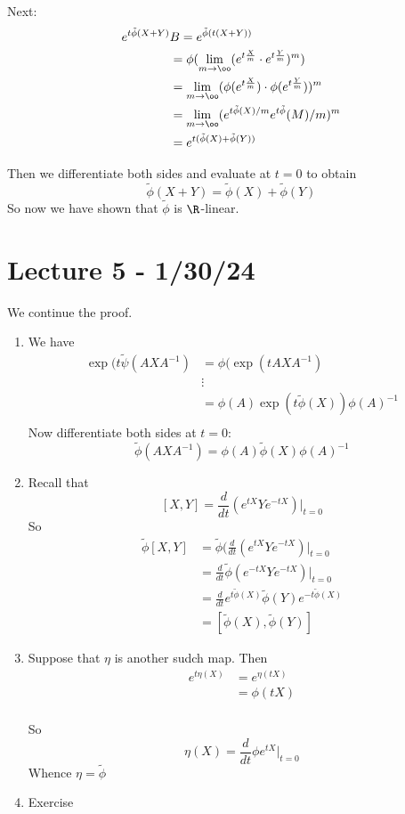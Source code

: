 \documentclass[x11names,reqno,14pt]{extarticle}
\newcommand{\tphi}{\tilde{\phi}}
\newcommand{\dd}[2]{\frac{d#1}{d#2}}
\begin{document}
Next: 
\begin{align*}
e^{t\tilde{\phi}(X + Y)} & B= e^{\tilde{\phi}(t(X + Y))}\\
								  & = \phi(\lim_{m\to\oo}(e^{t\frac{X}{m}}\cdot e^{t\frac{Y}{m}})^m) \\
								 & = \lim_{m\to\oo}(\phi(e^{t\frac{X}{m}})\cdot \phi(e^{t\frac{Y}{m}}))^m \\
								 & = \lim_{m\to\oo}(e^{t\tilde{\phi}(X)/m}e^{t\tilde{\phi}}(M)/m)^m \\
								 & = e^{t(\tilde{\phi}(X) + \tilde{\phi}(Y))}
\end{align*}

Then we differentiate both sides and evaluate at $t = 0$ to obtain
\[
\tilde{\phi}(X + Y) = \tilde{\phi}(X) + \tilde{\phi}(Y)
\]
So now we have shown that $\tilde{\phi}$ is $\R$-linear.

\section*{Lecture 5 - 1/30/24}

We continue the proof. 

\begin{enumerate}

\item We have 
\begin{align*}
\exp(t\tilde{\psi}(AXA^{-1}) & = \phi(\exp(tAXA^{-1}) \\
									   & \vdots \\
										& = \phi(A)\exp(t\tilde{\phi}(X))\phi(A)^{-1} \\
\end{align*}
Now differentiate both sides at $t = 0:$
\[
\tilde{\phi}(AXA^{-1}) = \phi(A)\tilde{\phi}(X)\phi(A)^{-1}
\]

\item Recall that 
\[
[X, Y] = \dd{}{t}(e^{tX}Ye^{-tX})|_{t=0}
\]
So 
\begin{align*}
\tilde{\phi}[X,Y] & = \tphi(\dd{}{t}(e^{tX}Ye^{-tX})|_{t=0} \\
& = \dd{}{t}\tphi(e^{-tX}Ye^{-tX})|_{t=0} \\
& = \dd{}{t}e^{t\tphi(X)}\tphi(Y)e^{-t\tphi(X)} \\
& = [\tphi(X),\tphi(Y)]
\end{align*}

\item

Suppose that $\eta$ is another sudch map. Then
\begin{align*}
e^{t\eta(X)} & =e^{\eta(tX)} \\
& = \phi(tX) \\
\end{align*}

So
\[
\eta(X) = \dd{}{t}\phi e^{tX}|_{t=0}
\]
Whence $\eta=\tphi$

\item Exercise

\end{enumerate}
\end{document}

